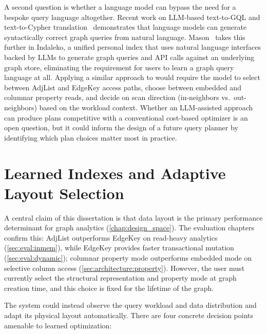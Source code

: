 A second question is whether a language model can bypass the need for a bespoke query language altogether.
Recent work on LLM-based text-to-GQL and text-to-Cypher translation~\cite{mandilara2025text2cypher, lyu2026text2graphquerybench} demonstrates that language models can generate syntactically correct graph queries from natural language.
Mason~\cite{mason2025indaleko} takes this further in Indaleko, a unified personal index that uses natural language interfaces backed by LLMs to generate graph queries and API calls against an underlying graph store, eliminating the requirement for users to learn a graph query language at all.
Applying a similar approach to \project{} would require the model to select between AdjList and EdgeKey access paths, choose between embedded and columnar property reads, and decide on scan direction (in-neighbors vs.\ out-neighbors) based on the workload context.
Whether an LLM-assisted approach can produce plans competitive with a conventional cost-based optimizer is an open question, but it could inform the design of a future query planner by identifying which plan choices matter most in practice.


\section{Learned Indexes and Adaptive Layout Selection}
\label{sec:future:learned}

A central claim of this dissertation is that data layout is the primary performance determinant for graph analytics (\autoref{chap:design_space}).
The evaluation chapters confirm this: AdjList outperforms EdgeKey on read-heavy analytics (\autoref{sec:eval:inmem}), while EdgeKey provides faster transactional mutation (\autoref{sec:eval:dynamic}); columnar property mode outperforms embedded mode on selective column access (\autoref{sec:architecture:property}).
However, the user must currently select the structural representation and property mode at graph creation time, and this choice is fixed for the lifetime of the graph.

The system could instead observe the query workload and data distribution and adapt its physical layout automatically.
There are four concrete decision points amenable to learned optimization:

